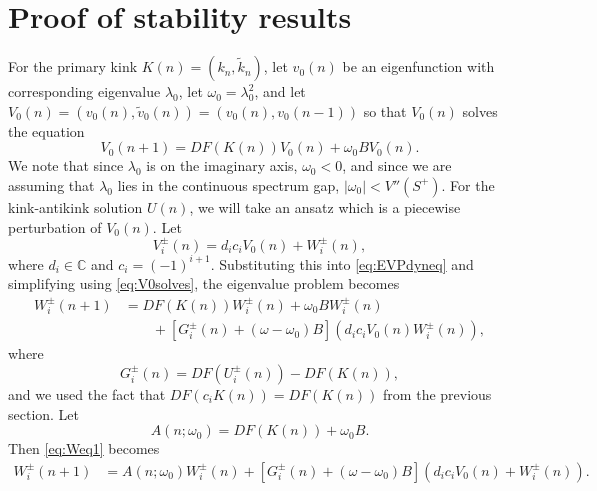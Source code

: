 \documentclass[12pt]{article}
\def\C{{\mathbb C}}
\begin{document}
\section{Proof of stability results}

For the primary kink $K(n) = (k_n, \tilde{k}_n)$, let $v_0(n)$ be an eigenfunction with corresponding eigenvalue $\lambda_0$, let $\omega_0 = \lambda_0^2$, and let $V_0(n) = (v_0(n), \tilde{v}_0(n)) = (v_0(n), v_0(n-1))$ so that $V_0(n)$ solves the equation
\begin{equation}\label{eq:V0solves}
V_0(n+1) = D F( K(n) )V_0(n) + \omega_0 B V_0(n).
\end{equation}
We note that since $\lambda_0$ is on the imaginary axis, $\omega_0 < 0$, and since we are assuming that $\lambda_0$ lies in the continuous spectrum gap, $|\omega_0| < V''(S^+)$. For the kink-antikink solution $U(n)$, we will take an ansatz which is a piecewise perturbation of $V_0(n)$. Let
\begin{equation}\label{eq:Viansatz}
V_i^\pm(n) = d_i c_i V_0(n) + W_i^\pm(n),
\end{equation}
where $d_i \in \C$ and $c_i = (-1)^{i+1}$. Substituting this into \cref{eq:EVPdyneq} and simplifying using \cref{eq:V0solves}, the eigenvalue problem becomes
\begin{equation}\label{eq:Weq1}
\begin{aligned}
W_i^\pm(n+1)
&= DF(K(n)) W_i^\pm(n) + \omega_0 B W_i^\pm(n) \\
&\qquad + [G_i^\pm(n) + (\omega - \omega_0) B](d_i c_i V_0(n) W_i^\pm(n)),
\end{aligned}
\end{equation}
where
\[
G_i^\pm(n) = DF(U_i^\pm(n)) - DF(K(n)),
\]
and we used the fact that $DF(c_i K(n)) = DF(K(n))$ from the previous section. Let 
\[
A(n; \omega_0) = DF(K(n)) + \omega_0 B.
\]
Then \cref{eq:Weq1} becomes
\begin{align}\label{eq:Weq2}
W_i^\pm(n+1)
&= A(n; \omega_0) W_i^\pm(n) + [G_i^\pm(n) + (\omega - \omega_0) B](d_i c_i V_0(n) + W_i^\pm(n)).
\end{align}
\end{document}
